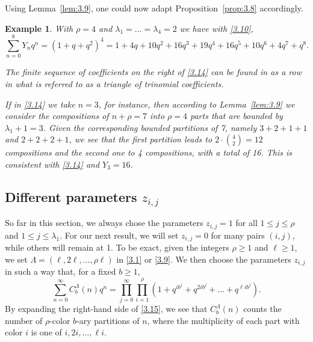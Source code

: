 \documentclass{amsart}
\theoremstyle{plain}
\newtheorem{example}[theorem]{Example}
\numberwithin{equation}{section}
\begin{document}
Using Lemma~\ref{lem:3.9}, one could now adapt Proposition~\ref{prop:3.8} 
accordingly.

\begin{example}\label{ex:3:10}
{\rm With $\rho=4$ and $\lambda_1=\dots=\lambda_4=2$ we have with \eqref{3.10},}
\begin{equation}\label{3.14}
\sum_{n=0}^8 Y_nq^n = \left(1+q+q^2\right)^4
=1+4q+10q^2+16q^3+19q^4+16q^5+10q^6+4q^7+q^8.
\end{equation}
{\rm The finite sequence of coefficients on the right of \eqref{3.14} 
can be found in \cite[A027907]{OEIS} as a row in what is referred to 
as a triangle of trinomial coefficients.
 
If in \eqref{3.14} we take $n=3$, for instance, then according to 
Lemma~\ref{lem:3.9} we 
consider the compositions of $n+\rho=7$ into $\rho=4$ parts that are bounded
by $\lambda_1+1=3$. Given the corresponding bounded {\it partitions} of 7,
namely $3+2+1+1$ and $2+2+2+1$, we see that the first partition leads to 
$2\cdot\binom{4}{2}=12$ compositions and the second one to 4 compositions, with
a total of 16. This is consistent with \eqref{3.14} and $Y_3=16$.}
\end{example}

\subsection{Different parameters $z_{i,j}$}\label{sec:4.2}

So far in this section, we always chose the parameters $z_{i,j}=1$ for all
$1\leq j\leq\rho$ and $1\leq j\leq\lambda_1$. For our next result, we will set
$z_{i,j}=0$ for many pairs $(i,j)$, while others will remain at 1. To be 
exact, given the integers $\rho\geq 1$ and $\ell\geq 1$, we set
$\Lambda=(\ell, 2\ell,\ldots, \rho\ell)$ in \eqref{3.1} or \eqref{3.9}. We then
choose the parameters $z_{i,j}$ in such a way that, for a fixed $b\geq 1$,
\begin{equation}\label{3.15}
\sum_{n=0}^\infty C_b^\Lambda(n)q^n =\prod_{j=0}^\infty\prod_{i=1}^\rho
\left(1+q^{ib^j}+q^{2ib^j}+\dots+q^{\ell ib^j}\right).
\end{equation}
By expanding the right-hand side of \eqref{3.15}, we see that $C_b^\Lambda(n)$
counts the number of $\rho$-color $b$-ary partitions of $n$, where the 
multiplicity of each part with color $i$ is one of $i, 2i,\ldots, \ell i$.
\end{document}
